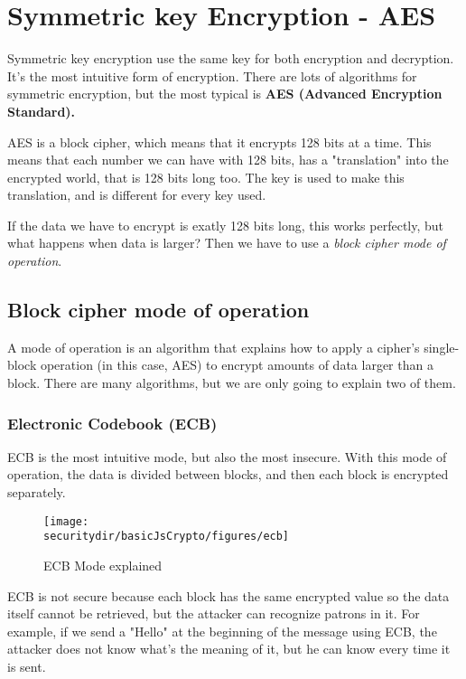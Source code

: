 \section{Symmetric key Encryption - AES}

Symmetric key encryption use the same key for both encryption and decryption. It's the most intuitive form of encryption. There are lots of algorithms for symmetric encryption, but the most typical is \textbf{AES (Advanced Encryption Standard).}

AES is a block cipher, which means that it encrypts 128 bits at a time. This means that each number we can have with 128 bits, has a "translation" into the encrypted world, that is 128 bits long too. The key is used to make this translation, and is different for every key used.

If the data we have to encrypt is exatly 128 bits long, this works perfectly, but what happens when data is larger? Then we have to use a \textit{block cipher mode of operation}.

\subsection{Block cipher mode of operation}
A mode of operation is an algorithm that explains how to apply a cipher's single-block operation (in this case, AES) to encrypt amounts of data larger than a block. There are many algorithms, but we are only going to explain two of them.

\subsubsection{Electronic Codebook (ECB)}
ECB is the most intuitive mode, but also the most insecure. With this mode of operation, the data is divided between blocks, and then each block is encrypted separately.
\begin{figure}[htb]
	\begin{centering}
		\texttt{[image: \\securitydir/basicJsCrypto/figures/ecb]}
		\par\end{centering}
	\caption{\label{fig:ecb} ECB Mode explained}
\end{figure}

ECB is not secure because each block has the same encrypted value so the data itself cannot be retrieved, but the attacker can recognize patrons in it. For example, if we send a "Hello" at the beginning of the message using ECB, the attacker does not know what's the meaning of it, but he can know every time it is sent.


